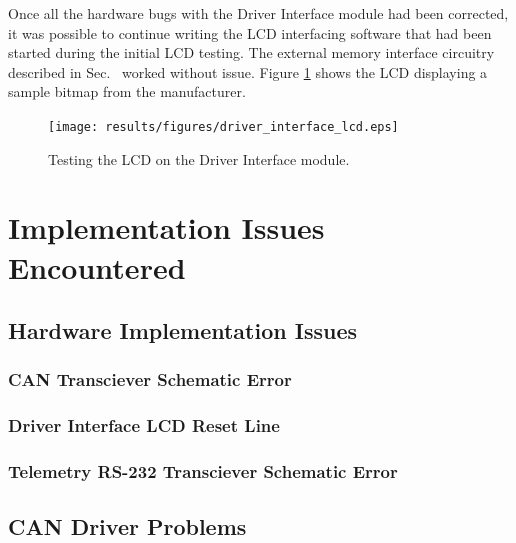 Once all the hardware bugs with the Driver Interface module had been corrected, it was possible to continue writing the LCD interfacing software that had been started during the initial LCD testing. The external memory interface circuitry described in Sec.\ \label{sec:lcd_module_data_interface} worked without issue. Figure \ref{fig:driver_interface_lcd} shows the LCD displaying a sample bitmap from the manufacturer.

\begin{figure}[h]
 \centering
 \texttt{[image: results/figures/driver\_interface\_lcd.eps]}
 \caption{Testing the LCD on the Driver Interface module.}
 \label{fig:driver_interface_lcd}
\end{figure}

\section{Implementation Issues Encountered}


\subsection{Hardware Implementation Issues}


\subsubsection{CAN Transciever Schematic Error}


\subsubsection{Driver Interface LCD Reset Line}


\subsubsection{Telemetry RS-232 Transciever Schematic Error}





\subsection{CAN Driver Problems}